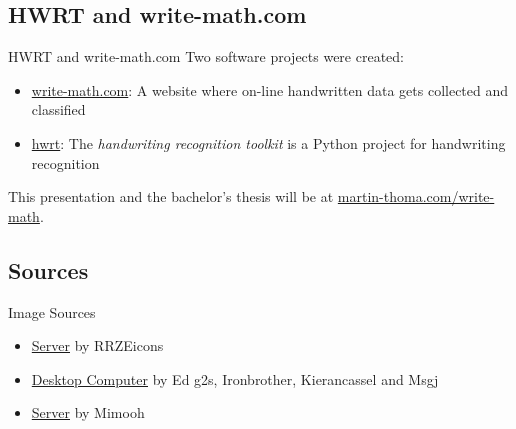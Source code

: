 \subsection{HWRT and write-math.com}
\begin{frame}{HWRT and write-math.com}
    Two software projects were created:
    \begin{itemize}
    \item \href{http://write-math.com}{write-math.com}: A website where
          on-line handwritten data gets collected and classified
    \item \href{https://github.com/MartinThoma/hwrt}{hwrt}: The
          \textit{handwriting recognition toolkit} is a Python project for
          handwriting recognition
    \end{itemize}

    This presentation and the bachelor's thesis will be at
    \href{http://martin-thoma.com/write-math/}{martin-thoma.com/write-math}.
\end{frame}

\subsection{Sources}
\begin{frame}{Image Sources}
    \begin{itemize}
	\item \href{https://commons.wikimedia.org/wiki/File:Server-multiple.svg}{Server} by RRZEicons
    \item \href{https://commons.wikimedia.org/wiki/File:Computer-aj_aj_ashton_01.svg}{Desktop Computer} by Ed g2s,
          Ironbrother, Kierancassel and Msgj
    \item \href{https://commons.wikimedia.org/wiki/File:Server_by_mimooh.svg}{Server} by Mimooh
    \end{itemize}
\end{frame}

